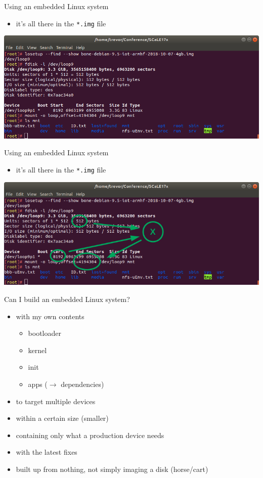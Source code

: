 \documentclass[aspectratio=169,obeyspaces,spaces,hyphens,dvipsnames]{beamer}
\begin{document}
\begin{frame}{Using an embedded Linux system}
  \begin{itemize}
    \item it's all there in the \texttt{*.img} file
  \end{itemize}
  \includegraphics[width=\textwidth]{woerner/mount-file.png}
\end{frame}

\begin{frame}{Using an embedded Linux system}
  \begin{itemize}
    \item it's all there in the \texttt{*.img} file
  \end{itemize}
  \includegraphics[width=\textwidth]{woerner/mount-file-circle.png}
\end{frame}

\begin{frame}{Can I build an embedded Linux system?}
  \begin{itemize}
    \item with my own contents
    \begin{itemize}
      \item bootloader
      \item kernel
      \item init
      \item apps ($\rightarrow$ dependencies)
    \end{itemize}
    \item to target multiple devices
    \item within a certain size (smaller)
    \item containing only what a production device needs
    \item with the latest fixes
    \item built up from nothing, not simply imaging a disk (horse/cart)
  \end{itemize}
\end{frame}
\end{document}
